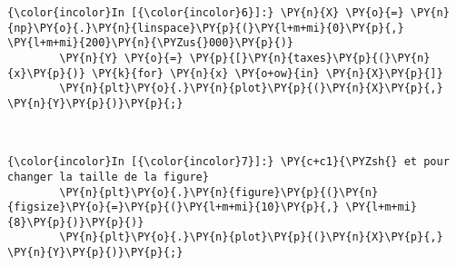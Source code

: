     \begin{Verbatim}[commandchars=\\\{\}]
{\color{incolor}In [{\color{incolor}6}]:} \PY{n}{X} \PY{o}{=} \PY{n}{np}\PY{o}{.}\PY{n}{linspace}\PY{p}{(}\PY{l+m+mi}{0}\PY{p}{,} \PY{l+m+mi}{200}\PY{n}{\PYZus{}000}\PY{p}{)}
        \PY{n}{Y} \PY{o}{=} \PY{p}{[}\PY{n}{taxes}\PY{p}{(}\PY{n}{x}\PY{p}{)} \PY{k}{for} \PY{n}{x} \PY{o+ow}{in} \PY{n}{X}\PY{p}{]}
        \PY{n}{plt}\PY{o}{.}\PY{n}{plot}\PY{p}{(}\PY{n}{X}\PY{p}{,} \PY{n}{Y}\PY{p}{)}\PY{p}{;}
\end{Verbatim}


    \begin{center}
    \end{center}
    { \hspace*{\fill} \\}
    
    \begin{Verbatim}[commandchars=\\\{\}]
{\color{incolor}In [{\color{incolor}7}]:} \PY{c+c1}{\PYZsh{} et pour changer la taille de la figure}
        \PY{n}{plt}\PY{o}{.}\PY{n}{figure}\PY{p}{(}\PY{n}{figsize}\PY{o}{=}\PY{p}{(}\PY{l+m+mi}{10}\PY{p}{,} \PY{l+m+mi}{8}\PY{p}{)}\PY{p}{)}
        \PY{n}{plt}\PY{o}{.}\PY{n}{plot}\PY{p}{(}\PY{n}{X}\PY{p}{,} \PY{n}{Y}\PY{p}{)}\PY{p}{;}
\end{Verbatim}


    \begin{center}
    \end{center}
    { \hspace*{\fill} \\}
    

    
    
    
